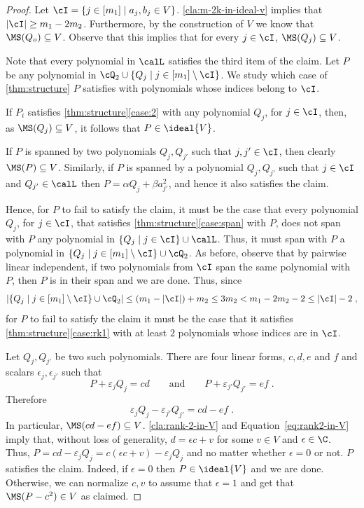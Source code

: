 \begin{proof}
Let $\cI = \lbrace j\in [m_1] \mid  a_j,b_j \in V\rbrace$.  \autoref{cla:m-2k-in-ideal-v} implies that $|\cI|\geq m_1-2m_2$. Furthermore, by the construction of $V$ we know that $\MS(Q_o)\subseteq V$. Observe that this implies that for every $j\in \cI$, $\MS(Q_j)\subseteq V$.

Note that every polynomial in $\calL$ satisfies the third item of the claim.
Let $P$ be any polynomial in $\cQ_2 \cup \{Q_j \mid j\in [m_1]\setminus \cI\}$. We study which case of \autoref{thm:structure} $P$ satisfies with polynomials whose indices belong to $\cI$.



If $P_i$ satisfies \autoref{thm:structure}\ref{case:2} with any polynomial $Q_j$, for $j\in \cI$, then, as $\MS(Q_j)\subseteq V$, it follows that  $P\in \ideal{V}$.

If $P$ is spanned by two polynomials $Q_j,Q_{j'}$ such that $j,j'\in \cI$, then clearly $\MS(P)\subseteq V$. Similarly, if $P$ is spanned by a polynomial $Q_j,Q_{j'}$ such that $j \in \cI$ and $Q_{j'}\in \calL$ then $P = \alpha Q_j + \beta a_{j'}^2$, and hence it also satisfies the claim.

Hence, for $P$ to fail to satisfy the claim, it must be the case that every polynomial $Q_j$, for $j\in\cI$, that satisfies \autoref{thm:structure}\ref{case:span} with $P$, does not span with $P$ any polynomial in $\{Q_j \mid j\in  \cI\} \cup \calL$. Thus, it must span with $P$ a polynomial in $\{Q_j \mid j\in [m_1]\setminus  \cI\} \cup \cQ_2$. As before, observe that by pairwise linear independent, if two polynomials from $\cI$ span the same polynomial with $P$, then $P$ is in their span and we are done. Thus, since 
$$\left|\{Q_j \mid j\in [m_1]\setminus  \cI\} \cup \cQ_2\right| \leq \left(m_1 - |\cI| \right) + m_2 \leq 3m_2 < m_1 -2m_2 -2 \leq |\cI| -2 \;,$$
for $P$ to fail to satisfy the claim it must be the case that 
it satisfies \autoref{thm:structure}\ref{case:rk1} with at least $2$ polynomials whose indices are in $\cI$. 

Let $Q_j,Q_{j'}$ be two such polynomials. There are four linear forms, $c,d,e$ and $f$ and scalars $\epsilon_j, \epsilon_{j'}$ such that
\begin{equation*}
P + \varepsilon_j Q_j = cd \quad\quad \text{and}\quad\quad
P + \varepsilon_{j'} Q_{j'} = ef \;.
\end{equation*} 
Therefore
\begin{equation} \label{eq:rank2-in-V}
\varepsilon_j Q_j -\varepsilon_{j'} Q_{j'} = cd -ef \;.
\end{equation} 
In particular, $\MS(cd -ef)\subseteq V$. \autoref{cla:rank-2-in-V} and Equation~\eqref{eq:rank2-in-V} imply that, without loss of generality,  $d = \epsilon c + v$ for some $v \in V$ and $\epsilon \in \C$. 
Thus, $P = cd -\varepsilon_j Q_j = c(\epsilon c+v) -\varepsilon_jQ_j$ and no matter whether $\epsilon=0$ or not. $P$ satisfies the claim. Indeed, if $\epsilon = 0$ then $P \in \ideal{V}$ and we are done. Otherwise, we can normalize $c,v$ to  assume that $\epsilon = 1$ and get that $\MS(P-c^2)\in V$ as claimed. 


\end{proof}

